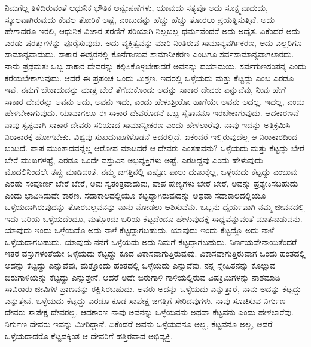 ನಿಮಗೆಲ್ಲ ತಿಳಿದಿರುವಂತೆ ಆಧುನಿಕ ಭೌತಿಕ ಅನ್ವೇಷಣೆಗಳು, ಯಾವುದು ಸತ್ಯವೊ ಅದು ಸೂಕ್ಷ್ಮವಾದುದು, ಸ್ಕೂಲವಾಗಿರುವುದು ಕೇವಲ ತೋರಿಕೆ ಅಷ್ಟೆ, ಎಂಬುದನ್ನು ಹೆಚ್ಚು ಹೆಚ್ಚು ತೋರಲು ಪ್ರಯತ್ನಿಸುತ್ತಿವೆ. ಅದು ಹೇಗಾದರೂ ಇರಲಿ, ಆಧುನಿಕ ವಿಚಾರ ಸರಣಿಗೆ ಸರಿಯಾಗಿ ನಿಲ್ಲಬಲ್ಲ ಧರ್ಮವೆಂದರೆ ಅದು ಅದೈತ. ಏಕೆಂದರೆ ಅದು ಎರಡು ಷರತ್ತುಗಳನ್ನು ಪೂರೈಸುವುದು. ಅದು ವ್ಯಕ್ತಿತ್ವವನ್ನು ಮಾರಿ ನಿಂತಿರುವ ಸಾಮಾನ್ಯವರ್ಗಿಕರಣ, ಅದು ಎಲ್ಲರಿಗೂ ಸಾಮಾನ್ಯವಾದುದು. ಸಾಕಾರ ಈಶ್ವರನಲ್ಲಿ ಕೊನೆಗಾಣುವ ಸಾಮಾನೀಕರಣ ಎಂದಿಗೂ ಸರ್ವಸಾಮಾನ್ಯವಾಗಲಾರದು. ನಾನು ಪ್ರಥಮತಃ ಒಬ್ಬ ಸಾಕಾರ ದೇವರನ್ನು ಕಲ್ಪಿಸಿಕೊಳ್ಳಬೇಕಾದರೆ ಅವನನ್ನು ದಯಾಮಯ, ಸರ್ವಗುಣಸಂಪನ್ನ ಎಂದು ಕರೆಯಬೇಕಾಗುವುದು. ಆದರೆ ಈ ಪ್ರಪಂಚ ಒಂದು ಮಿಶ್ರಣ. ಇದರಲ್ಲಿ ಒಳ್ಳೆಯದು ಮತ್ತು ಕೆಟ್ಟದ್ದು ಎಂಬ ಎರಡೂ ಇವೆ. ನಮಗೆ ಬೇಕಾದುದನ್ನು ಮಾತ್ರ ಬೇರೆ ತೆಗೆದುಕೊಂಡು ಅದನ್ನು ಸಾಕಾರ ದೇವರು ಎನ್ನುವೆವು, ನೀವು ಹೇಗೆ ಸಾಕಾರ ದೇವರನ್ನು ಅವನು ಅದು, ಅವನು ಇದು, ಎಂದು ಹೇಳುತ್ತೀರೋ ಹಾಗೆಯೇ ಅವನು ಅದಲ್ಲ, ಇದಲ್ಲ, ಎಂದು ಹೇಳಬೇಕಾಗುವುದು. ಯಾವಾಗಲೂ ಈ ಸಾಕಾರ ದೇವರೊಡನೆ ಒಬ್ಬ ಸೈತಾನನೂ ಇರಬೇಕಾಗುವುದು. ಆದಕಾರಣವೆ ನಾವು ಸ್ಪಷ್ಟವಾಗಿ ಸಾಕಾರ ದೇವರು ಸರಿಯಾದ ಸಾಮಾನ್ಯೀಕರಣ ಎಂದು ಹೇಳಲಾರೆವು. ನಾವು ಇದನ್ನು ಅತಿಕ್ರಮಿಸಿ ನಿರಾಕಾರಕ್ಕೆ ಹೋಗಬೇಕು. ವಿಶ್ವವು ಸುಖದುಃಖಗಳೊಡನೆ ಅದರಲ್ಲಿದೆ. ಏಕೆಂದರೆ ಇಲ್ಲಿರುವುದೆಲ್ಲ ಆ ನಿರಾಕಾರದಿಂದ ಬಂದಿದೆ. ಪಾಪ ಮುಂತಾದವನ್ನೆಲ್ಲ ಆರೋಪ ಮಾಡಿದರೆ ಆ ದೇವರು ಎಂತಹವನು? ಒಳ್ಳೆಯದು ಮತ್ತು ಕೆಟ್ಟದ್ದು ಬೇರೆ ಬೇರೆ ಮುಖಗಳಷ್ಟೆ, ಎರಡೂ ಒಂದೇ ವಸ್ತುವಿನ ಅಭಿವ್ಯಕ್ತಿಗಳು ಅಷ್ಟೆ. ಎರಡಿದ್ದವು ಎಂದು ಹೇಳುವುದು ಮೊದಲಿನಿಂದಲೇ ತಪ್ಪು ಮಾಡಿದಂತೆ. ನಮ್ಮ ಜಗತ್ತಿನಲ್ಲಿ ಎಷ್ಟೋ ಪಾಲು ದುಃಖಕ್ಕೆಲ್ಲ, ಒಳ್ಳೆಯದು ಕೆಟ್ಟದ್ದು ಎಂಬುವು ಎರಡು ಸಂಪೂರ್ಣ ಬೇರೆ ಬೇರೆ, ಅವು ಸ್ವತಂತ್ರವಾದುವು, ಪಾಪ ಪುಣ್ಯಗಳು ಬೇರೆ ಬೇರೆ, ಅವನ್ನು ಪ್ರತ್ಯೇಕಿಸಬಹುದು ಎಂದು ಭಾವಿಸಿದುದೇ ಕಾರಣ. ಸದಾಕಾಲದಲ್ಲಿಯೂ ಕೆಟ್ಟದ್ದಾಗಿರುವುದನ್ನು ಅಥವಾ ಸದಾಕಾಲದಲ್ಲಿಯೂ ಒಳ್ಳೆಯದಾಗಿರುವುದನ್ನು ತೋರಬಲ್ಲವನನ್ನು ನಾನು ನೋಡಲು ಆಶಿಸುವೆನು. ಒಬ್ಬನು ಧೈರ್ಯವಾಗಿ ನಮ್ಮ ಜೀವನದಲ್ಲಿ ಇದು ಬರಿಯ ಒಳ್ಳೆಯದೆಂದೂ, ಮತ್ತೊಂದು ಬರಿಯ ಕೆಟ್ಟದೆಂದೂ ಹೇಳುವುದಕ್ಕೆ ಸಾಧ್ಯವೆನ್ನುವಂತೆ ಮಾತನಾಡುವನು. ಯಾವುದು ಇಂದು ಒಳ್ಳೆಯದೊ ಅದು ನಾಳೆ ಕೆಟ್ಟದ್ದಾಗಬಹುದು. ಯಾವುದು ಇಂದು ಕೆಟ್ಟದ್ದೊ ಅದು ನಾಳೆ ಒಳ್ಳೆಯದಾಗಬಹುದು. ಯಾವುದು ನನಗೆ ಒಳ್ಳೆಯದು ಅದು ನಿಮಗೆ ಕೆಟ್ಟದ್ದಾಗಬಹುದು. ನಿರ್ಣಯವೇನಾಯಿತೆಂದರೆ ಇತರ ವಸ್ತುಗಳಂತೆಯೇ ಒಳ್ಳೆಯದು ಕೆಟ್ಟದ್ದು ಕೂಡ ವಿಕಾಸವಾಗುತ್ತಿರುವುವು. ವಿಕಾಸವಾಗುತ್ತಿರುವಾಗ ಒಂದು ಹಂತದಲ್ಲಿ ಅದನ್ನು ಕೆಟ್ಟದ್ದು ಎನ್ನುವೆವು, ಮತ್ತೊಂದು ಹಂತದಲ್ಲಿ ಒಳ್ಳೆಯದು ಎನ್ನುವೆವು. ನನ್ನ ಸ್ನೇಹಿತನನ್ನು ಕೊಲ್ಲುವ ಬಿರುಗಾಳಿಯನ್ನು ಕೆಟ್ಟದ್ದು ಎನ್ನುತ್ತೇನೆ. ಆದರೆ ಅದೇ ಬಿರುಗಾಳಿ ಗಾಳಿಯಲ್ಲಿರುವ ವಿಷಕ್ರಿಮಿಗಳನ್ನು ನಾಶಮಾಡಿ ಸಾವಿರಾರು ಜೀವಿಗಳ ಪ್ರಾಣವನ್ನು ರಕ್ಷಿಸಿರಬಹುದು. ಅವರು ಅದನ್ನು ಒಳ್ಳೆಯದು ಎನ್ನುತ್ತಾರೆ, ನಾನು ಅದನ್ನು ಕೆಟ್ಟದ್ದು ಎನ್ನುತ್ತೇನೆ. ಒಳ್ಳೆಯದು ಕೆಟ್ಟದ್ದು ಎರಡೂ ಕೂಡ ಸಾಪೇಕ್ಷ ಜಗತ್ತಿಗೆ ಸೇರಿದವುಗಳು. ನಾವು ಸೂಚಿಸುವ ನಿರ್ಗುಣ ದೇವರು ಸಾಪೇಕ್ಷ ದೇವರಲ್ಲ. ಆದಕಾರಣ ನಾವು ಅವನನ್ನು ಒಳ್ಳೆಯವನು ಅಥವಾ ಕೆಟ್ಟವನು ಎಂದು ಹೇಳಲಾರೆವು. ನಿರ್ಗುಣ ದೇವರು ಇವನ್ನು ಮೀರಿದ್ದಾನೆ. ಏಕೆಂದರೆ ಅವನು ಒಳ್ಳೆಯವನೂ ಅಲ್ಲ, ಕೆಟ್ಟವನೂ ಅಲ್ಲ, ಆದರೆ ಒಳ್ಳೆಯದಾದರೊ ಕೆಟ್ಟದಕ್ಕಿಂತ ಆ ದೇವರಿಗೆ ಹತ್ತಿರವಾದ ಅಭಿವ್ಯಕ್ತಿ.


